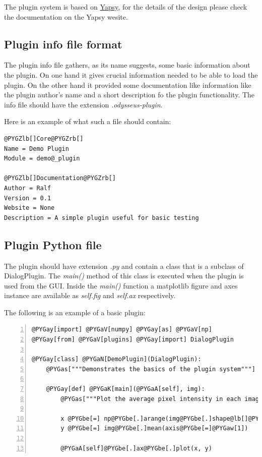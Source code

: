 \documentclass[letterpaper,10pt,english]{manual}
\begin{document}
The plugin system is based on \href{http://yapsy.sourceforge.net/}{Yapsy}, for the
details of the design please check the documentation on the Yapsy wesite.


\subsection{Plugin info file format}

The plugin info file gathers, as its name suggests, some basic
information about the plugin. On one hand it gives crucial information
needed to be able to load the plugin. On the other hand it provided
some documentation like information like the plugin author's name and
a short description fo the plugin functionality. The info file
should have the extension \emph{.odysseus-plugin}.

Here is an example of what such a file should contain:

\begin{Verbatim}[commandchars=@\[\]]
@PYGZlb[]Core@PYGZrb[]
Name = Demo Plugin
Module = demo@_plugin

@PYGZlb[]Documentation@PYGZrb[]
Author = Ralf
Version = 0.1
Website = None
Description = A simple plugin useful for basic testing
\end{Verbatim}


\subsection{Plugin Python file}

The plugin should have extension \emph{.py} and contain a class that
is a subclass of DialogPlugin. The
\emph{main()} method of this class is executed when the plugin is used from the
GUI. Inside the \emph{main()} function a matplotlib figure and axes instance are
available as \emph{self.fig} and \emph{self.ax} respectively.

The following is an example of a basic plugin:

\begin{Verbatim}[commandchars=@\[\],numbers=left,firstnumber=1,stepnumber=1]
@PYGay[import] @PYGaV[numpy] @PYGay[as] @PYGaV[np]
@PYGay[from] @PYGaV[plugins] @PYGay[import] DialogPlugin

@PYGay[class] @PYGaN[DemoPlugin](DialogPlugin):
    @PYGas["""Demonstrates the basics of the plugin system"""]

    @PYGay[def] @PYGaK[main](@PYGaA[self], img):
        @PYGas["""Plot the average pixel intensity in each image row"""]

        x @PYGbe[=] np@PYGbe[.]arange(img@PYGbe[.]shape@lb[]@PYGaw[0]@rb[])
        y @PYGbe[=] img@PYGbe[.]mean(axis@PYGbe[=]@PYGaw[1])

        @PYGaA[self]@PYGbe[.]ax@PYGbe[.]plot(x, y)
\end{Verbatim}
\end{document}
